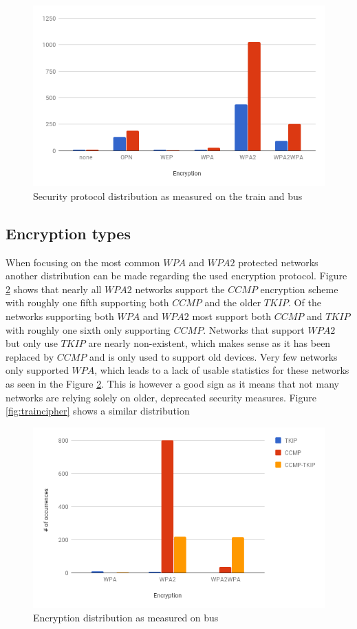 \documentclass[letterpaper, 10 pt, conference]{ieeeconf}  %
\begin{document}
\begin{figure}[h]
\includegraphics[scale=0.4]{Figures/EncryptionDist.png}
\caption{Security protocol distribution as measured on the train and bus}
\label{fig:encdist}
\end{figure}

\subsection{Encryption types}
When focusing on the most common $WPA$ and $WPA2$ protected networks another distribution can be made regarding the used encryption protocol. Figure \ref{fig:buscipher} shows that nearly all $WPA2$ networks support the $CCMP$ encryption scheme with roughly one fifth supporting both $CCMP$ and the older $TKIP$. Of the networks supporting both $WPA$ and $WPA2$ most support both $CCMP$ and $TKIP$ with roughly one sixth only supporting $CCMP$. Networks that support $WPA2$ but only use $TKIP$ are nearly non-existent, which makes sense as it has been replaced by $CCMP$ and is only used to support old devices. Very few networks only supported $WPA$, which leads to a lack of usable statistics for these networks as seen in the Figure \ref{fig:buscipher}. This is however a good sign as it means that not many networks are relying solely on older, deprecated security measures. Figure \ref{fig:traincipher} shows a similar distribution 




\begin{figure}[h]
\includegraphics[scale=0.4]{Figures/CipherBus.png}
\caption{Encryption distribution as measured on bus}
\label{fig:buscipher}
\end{figure}
\end{document}
